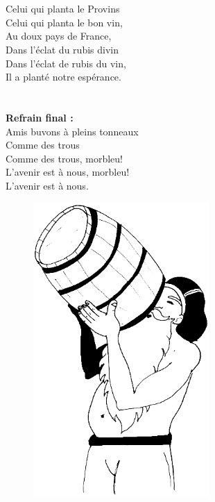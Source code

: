 \breakpage
\\\\Celui qui planta le Provins %
\\Celui qui planta le bon vin,
\\Au doux pays de France,
\\Dans l'éclat du rubis divin %
\\Dans l'éclat de rubis du vin,
\\Il a planté notre espérance.
\\\\\\\textbf{Refrain final :}
\\Amis buvons à pleins tonneaux
\\Comme des trous
\\Comme des trous, morbleu!
\\L'avenir est à nous, morbleu!
\\L'avenir est à nous.
\\
\begin{figure}[h!]
\centering
   \includegraphics[width=0.6\textwidth]{images/ah_que_nos_peres.png}
 \end{figure}

\breakpage